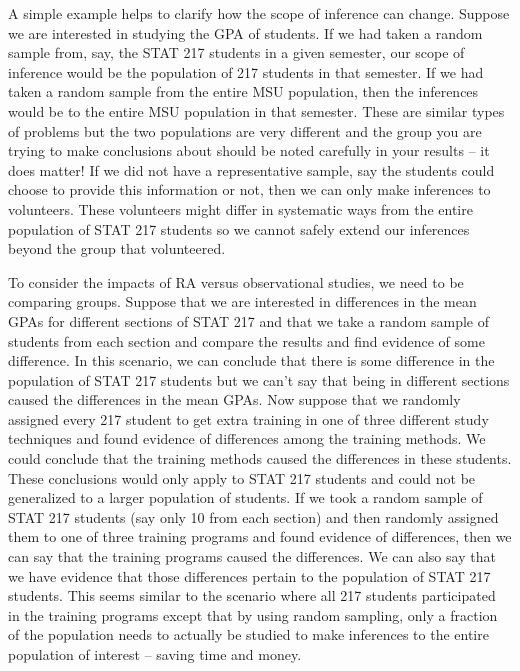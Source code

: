 \documentclass[]{book}
\begin{document}
A simple example helps to clarify how the scope of inference can change.
Suppose we are interested in studying the GPA of students. If we had
taken a random sample from, say, the STAT 217 students in a given
semester, our scope of inference would be the population of 217 students
in that semester. If we had taken a random sample from the entire MSU
population, then the inferences would be to the entire MSU population in
that semester. These are similar types of problems but the two
populations are very different and the group you are trying to make
conclusions about should be noted carefully in your results -- it does
matter! If we did not have a representative sample, say the students
could choose to provide this information or not, then we can only make
inferences to volunteers. These volunteers might differ in systematic
ways from the entire population of STAT 217 students so we cannot safely
extend our inferences beyond the group that volunteered.

To consider the impacts of RA versus observational studies, we need to
be comparing groups. Suppose that we are interested in differences in
the mean GPAs for different sections of STAT 217 and that we take a
random sample of students from each section and compare the results and
find evidence of some difference. In this scenario, we can conclude that
there is some difference in the population of STAT 217 students but we
can't say that being in different sections caused the differences in the
mean GPAs. Now suppose that we randomly assigned every 217 student to
get extra training in one of three different study techniques and found
evidence of differences among the training methods. We could conclude
that the training methods caused the differences in these students.
These conclusions would only apply to STAT 217 students and could not be
generalized to a larger population of students. If we took a random
sample of STAT 217 students (say only 10 from each section) and then
randomly assigned them to one of three training programs and found
evidence of differences, then we can say that the training programs
caused the differences. We can also say that we have evidence that those
differences pertain to the population of STAT 217 students. This seems
similar to the scenario where all 217 students participated in the
training programs except that by using random sampling, only a fraction
of the population needs to actually be studied to make inferences to the
entire population of interest -- saving time and money.
\end{document}
